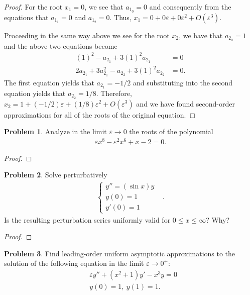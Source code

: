 \documentclass[12pt]{article}
\theoremstyle{definition}
\newtheorem{problem}{Problem}
\begin{document}
\begin{proof}
  For the root $x_1 = 0$, we see that $a_{1_0} = 0$ and consequently from the equations that $a_{1_1} = 0$ and $a_{1_2} = 0$. Thus,
  $x_1 = 0 + 0\varepsilon + 0\varepsilon^2 + O(\varepsilon^3)$.

  Proceeding in the same way above we see for the root $x_2$, we have that $a_{2_0} = 1$ and the above two
  equations become
  \begin{align*}
    (1)^2  -a_{2_1} + 3(1)^2a_{2_1} &= 0 \\
    2a_{2_1} + 3a_{2_1}^2 - a_{2_2} + 3(1)^2a_{2_2} &= 0.
  \end{align*}
  The first equation yields that $a_{2_1} = -1/2$ and substituting into the second
  equation yields that $a_{2_2} = 1/8$. Therefore,   $x_2 = 1 + (-1/2)\varepsilon + (1/8)\varepsilon^2 + O(\varepsilon^3)$
  and we have found second-order approximations for all of the roots of the original equation.


\end{proof}
\newpage


\begin{problem}
  Analyze in the limit $\varepsilon \to 0$ the roots of the polynomial
  \begin{align*}
    \varepsilon x^8 - \varepsilon^2 x^6 + x -2 = 0.
  \end{align*}
\end{problem}

\begin{proof}
\end{proof}
\newpage


\begin{problem}
  Solve perturbatively
  \begin{align*}
    \begin{cases}
      y'' = (\sin x)y &\\
      y(0) = 1 &\\
      y'(0) = 1
    \end{cases}.
  \end{align*}
  Is the resulting perturbation series uniformly valid for $0\leq x \leq \infty$? Why?
\end{problem}

\begin{proof}
\end{proof}
\newpage


\begin{problem}
  Find leading-order uniform asymptotic approximations to the solution of the
  following equation in the limit $\varepsilon \to 0^+$:
  \begin{align*}
    &\varepsilon y'' + (x^2 + 1)y' - x^3y=0 \\
    &y(0) = 1,\ y(1) = 1.
  \end{align*}
\end{problem}
\end{document}
